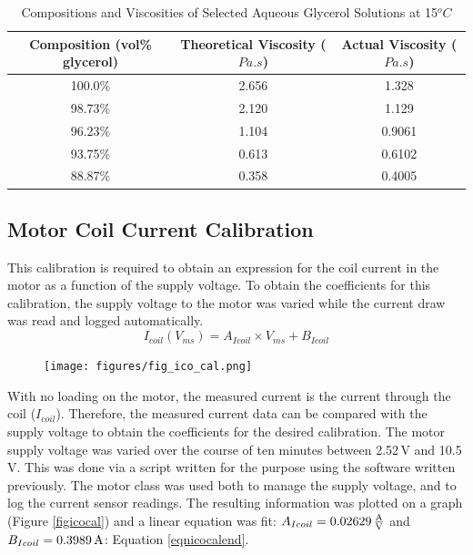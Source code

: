 \documentclass[twoside,a4]{report}
\begin{document}
	\begin{table}
		\centering
		\begin{tabular}{| c | c | c |}
			\hline
			Composition (vol\% glycerol) & Theoretical Viscosity ($Pa.s$) & Actual Viscosity ($Pa.s$)\\
			\hline
			100.0\% & 2.656 & 1.328 \\
			98.73\% & 2.120 & 1.129 \\
			96.23\% & 1.104 & 0.9061 \\
			93.75\% & 0.613 & 0.6102 \\
			88.87\% & 0.358 & 0.4005 \\
			\hline
		\end{tabular}
		\caption{Compositions and Viscosities of Selected Aqueous Glycerol Solutions at 15$^o C$}
		\label{tabreffluvisc}
	\end{table}
	
	\subsection*{Motor Coil Current Calibration}
	This calibration is required to obtain an expression for the coil current in the motor as a function of the supply voltage. To obtain the coefficients for this calibration, the supply voltage to the motor was varied while the current draw was read and logged automatically.
	\begin{equation}
	I_{coil} (V_{ms}) = A_{Icoil} \times V_{ms} + B_{Icoil}
	\label{eqnicocalmid}
	\end{equation}
	
	\begin{figure}[!htb]
		\centering
		\texttt{[image: figures/fig\_ico\_cal.png]}
		\caption{Coil Current Calibration Results}
		\label{figicocal}
		\begin{subfigure}{0.9\textwidth}
			\footnotesize 
		\end{subfigure}
	\end{figure}
	
	\noindent
	With no loading on the motor, the measured current is the current through the coil ($I_{coil}$). Therefore, the measured current data can be compared with the supply voltage to obtain the coefficients for the desired calibration. The motor supply voltage was varied over the course of ten minutes between 2.52\,V and 10.5\,V. This was done via a script written for the purpose using the software written previously. The motor class was used both to manage the supply voltage, and to log the current sensor readings. The resulting information was plotted on a graph (Figure \ref{figicocal}) and a linear equation was fit: $A_{Icoil} = 0.02629\,\rm\frac{A}{V}$ and $B_{Icoil} = 0.3989\,\rm A$: Equation \ref{eqnicocalend}.
	
\end{document}
